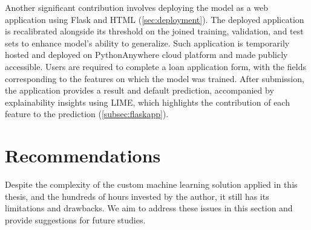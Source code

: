 Another significant contribution involves deploying the model as a web application using Flask and HTML (\autoref{sec:deployment}).
The deployed application is recalibrated alongside its threshold on the joined training, validation, and test sets to enhance model's ability to generalize.
Such application is temporarily hosted and deployed on PythonAnywhere cloud platform and made publicly accessible.
Users are required to complete a loan application form, with the fields corresponding to the features on which the model was trained.
After submission, the application provides a result and default prediction, accompanied by explainability insights using LIME, which highlights the contribution of each feature to the prediction (\autoref{subsec:flaskapp}).


\section{Recommendations}
\label{sec:recommendations}
Despite the complexity of the custom machine learning solution applied in this thesis, and the hundreds of hours invested by the author, it still has its limitations and drawbacks. We aim to address these issues in this section and provide suggestions for future studies.
